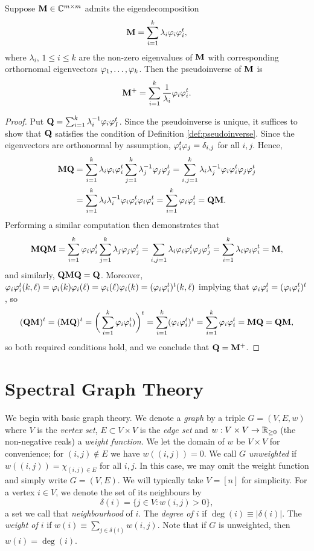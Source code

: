 \begin{lemma}
Suppose $\vb{M}\in\mathbb{C}^{m\times m}$ admits the eigendecomposition 
\[\vb{M}=\sum_{i=1}^k \lambda_i \varphi_i\varphi_i^t,\]
where $\lambda_i$, $1\leq i\leq k$ are the non-zero eigenvalues of $\vb{M}$ with corresponding orthornomal eigenvectors $\varphi_1,\dots,\varphi_k$. Then the pseudoinverse of $\vb{M}$ is 
\begin{equation}
    \label{eq:pseudoinverse}
    \vb{M}^+=\sum_{i=1}^k \frac{1}{\lambda_i}\varphi_i\varphi_i^t.
\end{equation}
\end{lemma}
\begin{proof}
Put $\vb{Q}=\sum_{i=1}^k \lambda_i^{-1}\varphi_i\varphi_I^t$. Since the pseudoinverse is unique, it suffices to show that $\vb{Q}$ satisfies the condition of Definition \ref{def:pseudoinverse}.
Since the eigenvectors are orthonormal by assumption, $\varphi_i^t\varphi_j=\delta_{i,j}$ for all $i,j$. Hence,  
\begin{align*}
    \vb{M}\vb{Q}&= \sum_{i=1}^k \lambda_i\varphi_i\varphi_i^t \sum_{j=1}^k \lambda_j^{-1}\varphi_j\varphi_j^t = \sum_{i,j=1}^k \lambda_i\lambda_j^{-1} \varphi_i\varphi_i^t \varphi_j\varphi_j^t \\
    &= \sum_{i=1}^k \lambda_i\lambda_i^{-1} \varphi_i\varphi_i^t\varphi_i\varphi_i^t 
    = \sum_{i=1}^k \varphi_i\varphi_i^t = \vb{Q}\vb{M}.
\end{align*}
Performing a similar computation then demonstrates that 
\[\vb{M}\vb{Q}\vb{M} = \sum_{i=1}^k \varphi_i\varphi_i^t \sum_{j=1}^k \lambda_j\varphi_j\varphi_j^t=\sum_{i,j=1}\lambda_i \varphi_i\varphi_i^t\varphi_j\varphi_j^t=\sum_{i=1}^k \lambda_i \varphi_i\varphi_i^t =\vb{M},\]
and similarly, $\vb{Q}\vb{M}\vb{Q}=\vb{Q}$. Moreover, $\varphi_i\varphi_i^t (k,\ell)=\varphi_i(k)\varphi_i(\ell)=\varphi_i(\ell)\varphi_i(k)=(\varphi_i\varphi_i^t)^t (k,\ell)$ implying that $\varphi_i\varphi_i^t=(\varphi_i\varphi_i^t)^t$, so 
\[(\vb{Q}\vb{M})^t=(\vb{M}\vb{Q})^t =\bigg(\sum_{i=1}^k \varphi_i\varphi_i^t )\bigg)^t = \sum_{i=1}^k (\varphi_i\varphi_i^t)^t = \sum_{i=1}^k \varphi_i\varphi_i^t=\vb{M}\vb{Q}=\vb{Q}\vb{M},\]
so both required conditions hold, and we conclude that $\vb{Q}=\vb{M}^+$. 
\end{proof}



\section{Spectral Graph Theory}
\label{sec:background_spectral}

We begin with basic graph theory. 
We denote a \emph{graph} by a triple $G=(V,E,w)$ where $V$ is the \emph{vertex set}, $E\subset V\times V$ is the \emph{edge set} and $w:V\times V\to\mathbb{R}_{\geq0}$ (the non-negative reals) a \emph{weight function}. We let the domain of $w$ be $V\times V$ for convenience; for $(i,j)\notin E$ we have $w((i,j))=0$. We call $G$ \emph{unweighted} if $w((i,j))=\chi_{(i,j)\in E}$ for all $i,j$. In this case, we may omit the weight function and simply write $G=(V,E)$. 
We will typically take $V=[n]$ for simplicity. For a  vertex $i\in V$, we denote the set of its neighbours by 
\[\delta(i) = \{j\in V:w(i,j)>0\},\]
a set we call that \emph{neighbourhood} of $i$. The \emph{degree of $i$} if $\deg(i)\equiv |\delta(i)|$. The \emph{weight of $i$} if $w(i)\equiv \sum_{j\in \delta(i)}w(i,j)$. Note that if $G$ is unweighted, then $w(i)=\deg(i)$. 

